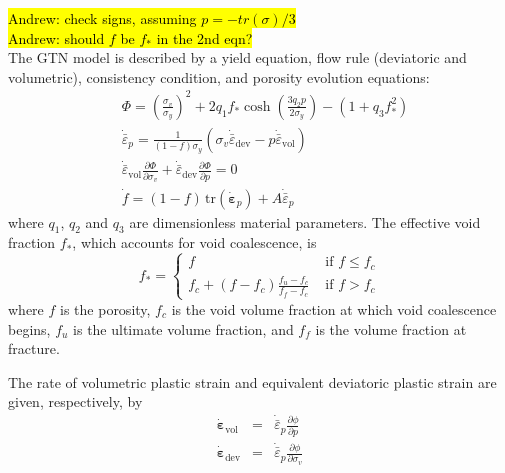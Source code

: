 \documentclass[sn-mathphys,Numbered,draft]{sn-jnl}%
\begin{document}
\hl{Andrew: check signs, assuming $p = -tr(\sigma)/3$}\\
\hl{Andrew: should $f$ be $f_*$ in the 2nd eqn?}\\
The GTN model is described by a yield equation, flow rule (deviatoric and volumetric), consistency condition, and porosity evolution equations:
\begin{eqnarray}
	&\Phi =
	\left(\frac{\sigma_v}{\sigma_y}\right)^2 + 2 q_1 f_* \cosh \left(\frac{3 q_2 p}{2 \sigma_y}\right)
	- \left(1 + q_3 f^{2}_* \right) \label{eqn:GTN1} \\
	&\dot{\bar{\varepsilon}}_p =
		\frac{1}{(1-f) \sigma_y} (\sigma_v \dot{ \bar{\varepsilon}}_\text{dev} - p \dot{ \bar{\varepsilon}}_\text{vol}) \label{eqn:GTN2} \\
	&\dot{\bar{\varepsilon}}_\text{vol} \frac{\partial \Phi}{\partial \sigma_v}
		+ \dot{\bar{\varepsilon}}_\text{dev} \frac{\partial \Phi}{\partial p} = 0 \label{eqn:GTN3} \\
	&\dot{f} = (1-f) \, \text{tr}\left(\dot{\boldsymbol{\varepsilon}}_p\right)+A \dot{\bar{\varepsilon}}_p \label{eqn:GTN4}
\end{eqnarray}
where $q_1$, $q_2$ and $q_3$ are dimensionless material parameters.
The effective void fraction $f_*$, which accounts for void coalescence, is
\begin{equation} \label{eqn:GTNCoalescence}
	f_*=
	\left\{
	\begin{array}{cc}
		f & \text { if } f \leq f_c \\
		f_c+\left(f-f_c\right) \frac{f_u-f_c}{f_f-f_c} & \text { if } f>f_c
	\end{array}\right.
\end{equation}
where $f$ is the porosity, $f_c$ is the void volume fraction at which void coalescence begins, $f_u$ is the ultimate volume fraction, and $f_f$ is the volume fraction at fracture.

The rate of volumetric plastic strain and equivalent deviatoric plastic strain are given, respectively, by
\begin{eqnarray}
	\dot{ \boldsymbol{\varepsilon}}_\text{vol} &=& \dot{\bar{\varepsilon}}_p \frac{\partial \phi}{\partial p} \\
	\dot{ \boldsymbol{\varepsilon}}_\text{dev} &=& \dot{\bar{\varepsilon}}_p \frac{\partial \phi}{\partial \sigma_v}
\end{eqnarray}
\end{document}
